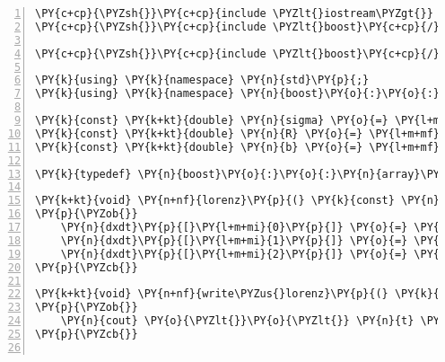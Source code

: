 \begin{Verbatim}[commandchars=\\\{\},numbers=left,firstnumber=1,stepnumber=1]
\PY{c+cp}{\PYZsh{}}\PY{c+cp}{include \PYZlt{}iostream\PYZgt{}}
\PY{c+cp}{\PYZsh{}}\PY{c+cp}{include \PYZlt{}boost}\PY{c+cp}{/}\PY{c+cp}{array.hpp\PYZgt{}}

\PY{c+cp}{\PYZsh{}}\PY{c+cp}{include \PYZlt{}boost}\PY{c+cp}{/}\PY{c+cp}{numeric}\PY{c+cp}{/}\PY{c+cp}{odeint.hpp\PYZgt{}}

\PY{k}{using} \PY{k}{namespace} \PY{n}{std}\PY{p}{;}
\PY{k}{using} \PY{k}{namespace} \PY{n}{boost}\PY{o}{:}\PY{o}{:}\PY{n}{numeric}\PY{o}{:}\PY{o}{:}\PY{n}{odeint}\PY{p}{;}

\PY{k}{const} \PY{k+kt}{double} \PY{n}{sigma} \PY{o}{=} \PY{l+m+mf}{10.0}\PY{p}{;}
\PY{k}{const} \PY{k+kt}{double} \PY{n}{R} \PY{o}{=} \PY{l+m+mf}{28.0}\PY{p}{;}
\PY{k}{const} \PY{k+kt}{double} \PY{n}{b} \PY{o}{=} \PY{l+m+mf}{8.0} \PY{o}{/} \PY{l+m+mf}{3.0}\PY{p}{;}

\PY{k}{typedef} \PY{n}{boost}\PY{o}{:}\PY{o}{:}\PY{n}{array}\PY{o}{\PYZlt{}} \PY{k+kt}{double} \PY{p}{,} \PY{l+m+mi}{3} \PY{o}{\PYZgt{}} \PY{n}{state\PYZus{}type}\PY{p}{;}

\PY{k+kt}{void} \PY{n+nf}{lorenz}\PY{p}{(} \PY{k}{const} \PY{n}{state\PYZus{}type} \PY{o}{\PYZam{}}\PY{n}{x} \PY{p}{,} \PY{n}{state\PYZus{}type} \PY{o}{\PYZam{}}\PY{n}{dxdt} \PY{p}{,} \PY{k+kt}{double} \PY{n}{t} \PY{p}{)}
\PY{p}{\PYZob{}}
    \PY{n}{dxdt}\PY{p}{[}\PY{l+m+mi}{0}\PY{p}{]} \PY{o}{=} \PY{n}{sigma} \PY{o}{*} \PY{p}{(} \PY{n}{x}\PY{p}{[}\PY{l+m+mi}{1}\PY{p}{]} \PY{o}{\PYZhy{}} \PY{n}{x}\PY{p}{[}\PY{l+m+mi}{0}\PY{p}{]} \PY{p}{)}\PY{p}{;}
    \PY{n}{dxdt}\PY{p}{[}\PY{l+m+mi}{1}\PY{p}{]} \PY{o}{=} \PY{n}{R} \PY{o}{*} \PY{n}{x}\PY{p}{[}\PY{l+m+mi}{0}\PY{p}{]} \PY{o}{\PYZhy{}} \PY{n}{x}\PY{p}{[}\PY{l+m+mi}{1}\PY{p}{]} \PY{o}{\PYZhy{}} \PY{n}{x}\PY{p}{[}\PY{l+m+mi}{0}\PY{p}{]} \PY{o}{*} \PY{n}{x}\PY{p}{[}\PY{l+m+mi}{2}\PY{p}{]}\PY{p}{;}
    \PY{n}{dxdt}\PY{p}{[}\PY{l+m+mi}{2}\PY{p}{]} \PY{o}{=} \PY{o}{\PYZhy{}}\PY{n}{b} \PY{o}{*} \PY{n}{x}\PY{p}{[}\PY{l+m+mi}{2}\PY{p}{]} \PY{o}{+} \PY{n}{x}\PY{p}{[}\PY{l+m+mi}{0}\PY{p}{]} \PY{o}{*} \PY{n}{x}\PY{p}{[}\PY{l+m+mi}{1}\PY{p}{]}\PY{p}{;}
\PY{p}{\PYZcb{}}

\PY{k+kt}{void} \PY{n+nf}{write\PYZus{}lorenz}\PY{p}{(} \PY{k}{const} \PY{n}{state\PYZus{}type} \PY{o}{\PYZam{}}\PY{n}{x} \PY{p}{,} \PY{k}{const} \PY{k+kt}{double} \PY{n}{t} \PY{p}{)}
\PY{p}{\PYZob{}}
    \PY{n}{cout} \PY{o}{\PYZlt{}}\PY{o}{\PYZlt{}} \PY{n}{t} \PY{o}{\PYZlt{}}\PY{o}{\PYZlt{}} \PY{l+s+sc}{\PYZsq{}\PYZbs{}t\PYZsq{}} \PY{o}{\PYZlt{}}\PY{o}{\PYZlt{}} \PY{n}{x}\PY{p}{[}\PY{l+m+mi}{0}\PY{p}{]} \PY{o}{\PYZlt{}}\PY{o}{\PYZlt{}} \PY{l+s+sc}{\PYZsq{}\PYZbs{}t\PYZsq{}} \PY{o}{\PYZlt{}}\PY{o}{\PYZlt{}} \PY{n}{x}\PY{p}{[}\PY{l+m+mi}{1}\PY{p}{]} \PY{o}{\PYZlt{}}\PY{o}{\PYZlt{}} \PY{l+s+sc}{\PYZsq{}\PYZbs{}t\PYZsq{}} \PY{o}{\PYZlt{}}\PY{o}{\PYZlt{}} \PY{n}{x}\PY{p}{[}\PY{l+m+mi}{2}\PY{p}{]} \PY{o}{\PYZlt{}}\PY{o}{\PYZlt{}} \PY{n}{endl}\PY{p}{;}
\PY{p}{\PYZcb{}}


\end{Verbatim}
